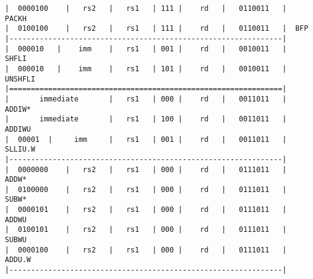 \begin{minipage}{\linewidth}
\begin{verbatim}
|  0000100    |   rs2   |   rs1   | 111 |    rd   |   0110011   |  PACKH
|  0100100    |   rs2   |   rs1   | 111 |    rd   |   0110011   |  BFP
|---------------------------------------------------------------|
|  000010   |    imm    |   rs1   | 001 |    rd   |   0010011   |  SHFLI
|  000010   |    imm    |   rs1   | 101 |    rd   |   0010011   |  UNSHFLI
|===============================================================|
|       immediate       |   rs1   | 000 |    rd   |   0011011   |  ADDIW*
|       immediate       |   rs1   | 100 |    rd   |   0011011   |  ADDIWU
|  00001  |     imm     |   rs1   | 001 |    rd   |   0011011   |  SLLIU.W
|---------------------------------------------------------------|
|  0000000    |   rs2   |   rs1   | 000 |    rd   |   0111011   |  ADDW*
|  0100000    |   rs2   |   rs1   | 000 |    rd   |   0111011   |  SUBW*
|  0000101    |   rs2   |   rs1   | 000 |    rd   |   0111011   |  ADDWU
|  0100101    |   rs2   |   rs1   | 000 |    rd   |   0111011   |  SUBWU
|  0000100    |   rs2   |   rs1   | 000 |    rd   |   0111011   |  ADDU.W
|---------------------------------------------------------------|
\end{verbatim}
\end{minipage}

